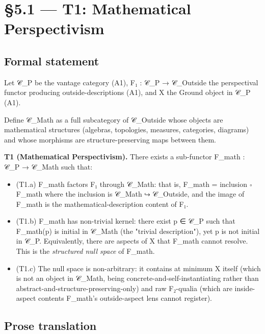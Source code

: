 \documentclass[11pt, openany]{book}
\newcommand{\sectionbreak}{\clearpage}
\begin{document}
\sectionbreak

\section{§5.1 --- T1: Mathematical Perspectivism}

\subsection{Formal statement}

Let 𝒞\_\allowbreak{}P be the vantage category (A1), F₁ : 𝒞\_\allowbreak{}P → 𝒞\_\allowbreak{}Outside the perspectival functor producing outside-descriptions (A1), and X the Ground object in 𝒞\_\allowbreak{}P (A1).

Define 𝒞\_\allowbreak{}Math as a full subcategory of 𝒞\_\allowbreak{}Outside whose objects are mathematical structures (algebras, topologies, measures, categories, diagrams) and whose morphisms are structure-preserving maps between them.

\textbf{T1 (Mathematical Perspectivism).} There exists a sub-functor F\_\allowbreak{}math : 𝒞\_\allowbreak{}P → 𝒞\_\allowbreak{}Math such that:

\begin{itemize}
\item (T1.a) F\_\allowbreak{}math factors F₁ through 𝒞\_\allowbreak{}Math: that is, F\_\allowbreak{}math = inclusion ∘ F\_\allowbreak{}math where the inclusion is 𝒞\_\allowbreak{}Math ↪ 𝒞\_\allowbreak{}Outside, and the image of F\_\allowbreak{}math is the mathematical-description content of F₁.
\item (T1.b) F\_\allowbreak{}math has non-trivial kernel: there exist p ∈ 𝒞\_\allowbreak{}P such that F\_\allowbreak{}math(p) is initial in 𝒞\_\allowbreak{}Math (the "trivial description"), yet p is not initial in 𝒞\_\allowbreak{}P. Equivalently, there are aspects of X that F\_\allowbreak{}math cannot resolve. This is the \textit{structured null space} of F\_\allowbreak{}math.
\item (T1.c) The null space is non-arbitrary: it contains at minimum X itself (which is not an object in 𝒞\_\allowbreak{}Math, being concrete-and-self-instantiating rather than abstract-and-structure-preserving-only) and raw F₂-qualia (which are inside-aspect contents F\_\allowbreak{}math's outside-aspect lens cannot register).
\end{itemize}

\subsection{Prose translation}
\end{document}
